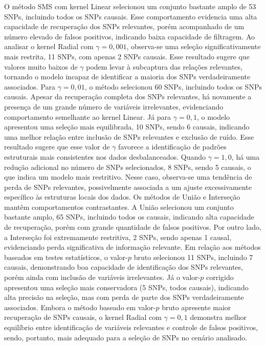 \documentclass[
    12pt,
    a4paper,
    oneside,
    english,
    french,
    spanish,
    brazil
    ]{abntex2}
\begin{document}
O método SMS com kernel Linear selecionou um conjunto bastante amplo de 53 SNPs, incluindo todos os SNPs causais. Esse comportamento evidencia uma alta capacidade de recuperação dos SNPs relevantes, porém acompanhado de um número elevado de falsos positivos, indicando baixa capacidade de filtragem. Ao analisar o kernel Radial com $\gamma = 0{,}001$, observa-se uma seleção significativamente mais restrita, 11 SNPs, com apenas 2 SNPs causais. Esse resultado sugere que valores muito baixos de $\gamma$ podem levar à subcaptura das relações relevantes, tornando o modelo incapaz de identificar a maioria dos SNPs verdadeiramente associados. Para $\gamma = 0{,}01$, o método selecionou 60 SNPs, incluindo todos os SNPs causais. Apesar da recuperação completa dos SNPs relevantes, há novamente a presença de um grande número de variáveis irrelevantes, evidenciando comportamento semelhante ao kernel Linear. Já para $\gamma = 0{,}1$, o modelo apresentou uma seleção mais equilibrada, 10 SNPs, sendo 6 causais, indicando uma melhor relação entre inclusão de SNPs relevantes e exclusão de ruído. Esse resultado sugere que esse valor de $\gamma$ favorece a identificação de padrões estruturais mais consistentes nos dados desbalanceados. Quando $\gamma = 1{,}0$, há uma redução adicional no número de SNPs selecionados, 8 SNPs, sendo 5 causais, o que indica um modelo mais restritivo. Nesse caso, observa-se uma tendência de perda de SNPs relevantes, possivelmente associada a um ajuste excessivamente específico às estruturas locais dos dados. Os métodos de União e Interseção mantêm comportamentos contrastantes. A União selecionou um conjunto bastante amplo, 65 SNPs, incluindo todos os causais, indicando alta capacidade de recuperação, porém com grande quantidade de falsos positivos. Por outro lado, a Interseção foi extremamente restritiva, 2 SNPs, sendo apenas 1 causal, evidenciando perda significativa de informação relevante. Em relação aos métodos baseados em testes estatísticos, o valor-$p$ bruto selecionou 11 SNPs, incluindo 7 causais, demonstrando boa capacidade de identificação dos SNPs relevantes, porém ainda com inclusão de variáveis irrelevantes. Já o valor-$p$ corrigido apresentou uma seleção mais conservadora (5 SNPs, todos causais), indicando alta precisão na seleção, mas com perda de parte dos SNPs verdadeiramente associados. Embora o método baseado em valor-$p$ bruto apresente maior recuperação de SNPs causais, o kernel Radial com $\gamma = 0{,}1$ demonstra melhor equilíbrio entre identificação de variáveis relevantes e controle de falsos positivos, sendo, portanto, mais adequado para a seleção de SNPs no cenário analisado.
\end{document}
